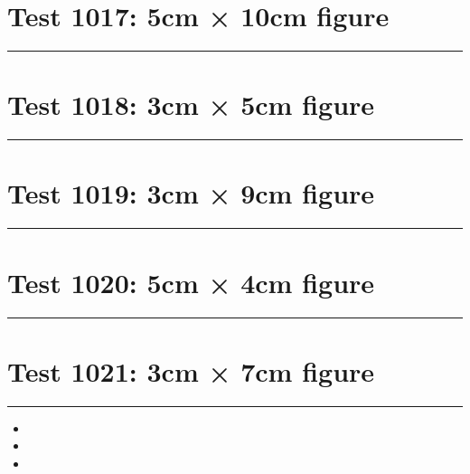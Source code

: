 \documentclass[a4paper,11pt]{article}
\begin{document}
\section*{Test 1017: 5cm × 10cm figure}
\begin{swarmwrap}%
  \begin{minipage}[t]{5cm}
    \centering
    \rule{\linewidth}{10cm}
  \end{minipage}%
\end{swarmwrap}%
\swarmwrapnext
\lipsum[27]
\lipsum[28]
\lipsum[29]
\section*{Test 1018: 3cm × 5cm figure}
\begin{swarmwrap}%
  \begin{minipage}[t]{3cm}
    \centering
    \rule{\linewidth}{5cm}
  \end{minipage}%
\end{swarmwrap}%
\swarmwrapnext
\lipsum[77]
\lipsum[78]
\lipsum[79]
\lipsum[80]
\lipsum[81]
\lipsum[82]
\section*{Test 1019: 3cm × 9cm figure}
\begin{swarmwrap}%
  \begin{minipage}[t]{3cm}
    \centering
    \rule{\linewidth}{9cm}
  \end{minipage}%
\end{swarmwrap}%
\swarmwrapnext
\lipsum[27]
\lipsum[28]
\lipsum[29]
\section*{Test 1020: 5cm × 4cm figure}
\begin{swarmwrap}%
  \begin{minipage}[t]{5cm}
    \centering
    \rule{\linewidth}{4cm}
  \end{minipage}%
\end{swarmwrap}%
\swarmwrapnext
\lipsum[76]
\lipsum[77]
\lipsum[78]
\section*{Test 1021: 3cm × 7cm figure}
\begin{swarmwrap}%
  \begin{minipage}[t]{3cm}
    \centering
    \rule{\linewidth}{7cm}
  \end{minipage}%
\end{swarmwrap}
\begin{itemize}
  \item \swarmwrapnext\lipsum[30][1-4]
  \item \lipsum[32][1-3]
  \item \lipsum[33][1-3]
\end{itemize}
\end{document}
